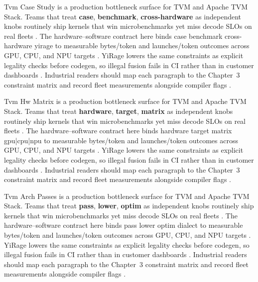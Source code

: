 Tvm Case Study is a production bottleneck surface for TVM and Apache TVM Stack. Teams that treat \textbf{case}, \textbf{benchmark}, \textbf{cross-hardware} as independent knobs routinely ship kernels that win microbenchmarks yet miss decode SLOs on real fleets \citep{taxbreak2026,semianalysis2024tma}. The hardware--software contract here binds case benchmark cross-hardware yirage to measurable bytes/token and launches/token outcomes across GPU, CPU, and NPU targets \citep{memoryfloor2026,amd2024xdna}. YiRage lowers the same constraints as explicit legality checks before codegen, so illegal fusion fails in CI rather than in customer dashboards \citep{nvidia2022hopper,amd2024aie}. Industrial readers should map each paragraph to the Chapter~3 constraint matrix and record fleet measurements alongside compiler flags \citep{semianalysis2024tma,dlbook}.

Tvm Hw Matrix is a production bottleneck surface for TVM and Apache TVM Stack. Teams that treat \textbf{hardware}, \textbf{target}, \textbf{matrix} as independent knobs routinely ship kernels that win microbenchmarks yet miss decode SLOs on real fleets \citep{memoryfloor2026,amd2024xdna}. The hardware--software contract here binds hardware target matrix gpu|cpu|npu to measurable bytes/token and launches/token outcomes across GPU, CPU, and NPU targets \citep{nvidia2022hopper,amd2024aie}. YiRage lowers the same constraints as explicit legality checks before codegen, so illegal fusion fails in CI rather than in customer dashboards \citep{semianalysis2024tma,dlbook}. Industrial readers should map each paragraph to the Chapter~3 constraint matrix and record fleet measurements alongside compiler flags \citep{amd2024xdna,dao2022flashattention}.

Tvm Arch Passes is a production bottleneck surface for TVM and Apache TVM Stack. Teams that treat \textbf{pass}, \textbf{lower}, \textbf{optim} as independent knobs routinely ship kernels that win microbenchmarks yet miss decode SLOs on real fleets \citep{nvidia2022hopper,amd2024aie}. The hardware--software contract here binds pass lower optim dialect to measurable bytes/token and launches/token outcomes across GPU, CPU, and NPU targets \citep{semianalysis2024tma,dlbook}. YiRage lowers the same constraints as explicit legality checks before codegen, so illegal fusion fails in CI rather than in customer dashboards \citep{amd2024xdna,dao2022flashattention}. Industrial readers should map each paragraph to the Chapter~3 constraint matrix and record fleet measurements alongside compiler flags \citep{amd2024aie,kwon2023vllm}.

